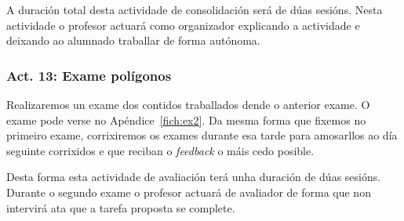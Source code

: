 A duración total desta actividade de consolidación será de dúas sesións. Nesta actividade o profesor actuará como organizador explicando a actividade e deixando ao alumnado traballar de forma autónoma.

\subsubsection{Act. 13: Exame polígonos}\label{act:examen2}
Realizaremos un exame dos contidos traballados dende o anterior exame. O exame pode verse no Apéndice~\ref{fich:ex2}. Da mesma forma que fixemos no primeiro exame, corrixiremos os exames durante esa tarde para amosarllos ao día seguinte corrixidos e que reciban o \emph{feedback} o máis cedo posible.

Desta forma esta actividade de avaliación terá unha duración de dúas sesións. Durante o segundo exame o profesor actuará de avaliador de forma que non intervirá ata que a tarefa proposta se complete.
